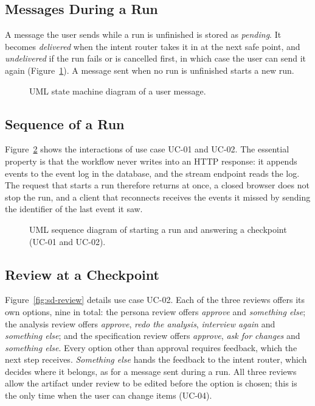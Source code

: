 \subsection{Messages During a Run}
\label{sec:sd-messages}

A message the user sends while a run is unfinished is stored as \emph{pending}. It becomes \emph{delivered} when the intent router takes it in at the next safe point, and \emph{undelivered} if the run fails or is cancelled first, in which case the user can send it again (Figure~\ref{fig:sd-message-delivery}). A message sent when no run is unfinished starts a new run.

\begin{figure}[H]
    \centering
    \resizebox{0.9\linewidth}{!}{}
    \caption{UML state machine diagram of a user message.}
    \label{fig:sd-message-delivery}
\end{figure}

\subsection{Sequence of a Run}
\label{sec:sd-sequence}

Figure~\ref{fig:sd-sequence} shows the interactions of use case UC-01 and UC-02. The essential property is that the workflow never writes into an HTTP response: it appends events to the event log in the database, and the stream endpoint reads the log. The request that starts a run therefore returns at once, a closed browser does not stop the run, and a client that reconnects receives the events it missed by sending the identifier of the last event it saw.

\begin{figure}[H]
    \centering
    \resizebox{\linewidth}{!}{}
    \caption{UML sequence diagram of starting a run and answering a checkpoint (UC-01 and UC-02).}
    \label{fig:sd-sequence}
\end{figure}

\subsection{Review at a Checkpoint}
\label{sec:sd-review}

Figure~\ref{fig:sd-review} details use case UC-02. Each of the three reviews offers its own options, nine in total: the persona review offers \emph{approve} and \emph{something else}; the analysis review offers \emph{approve}, \emph{redo the analysis}, \emph{interview again} and \emph{something else}; and the specification review offers \emph{approve}, \emph{ask for changes} and \emph{something else}. Every option other than approval requires feedback, which the next step receives. \emph{Something else} hands the feedback to the intent router, which decides where it belongs, as for a message sent during a run. All three reviews allow the artifact under review to be edited before the option is chosen; this is the only time when the user can change items (UC-04).

